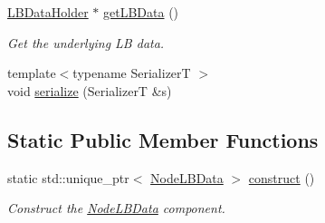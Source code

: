 \begin{DoxyCompactItemize}
\hyperlink{structvt_1_1vrt_1_1collection_1_1balance_1_1_l_b_data_holder}{L\+B\+Data\+Holder} $\ast$ \hyperlink{structvt_1_1vrt_1_1collection_1_1balance_1_1_node_l_b_data_aa67707482afa83dfa96910ac42337ef0}{get\+L\+B\+Data} ()
\begin{DoxyCompactList}\small\item\em Get the underlying LB data. \end{DoxyCompactList}\item 
{\footnotesize template$<$typename SerializerT $>$ }\\void \hyperlink{structvt_1_1vrt_1_1collection_1_1balance_1_1_node_l_b_data_aa6b20e4b1920e9294fb8b933dcd8a35b}{serialize} (SerializerT \&s)
\end{DoxyCompactItemize}
\subsection*{Static Public Member Functions}
\begin{DoxyCompactItemize}
\item 
static std\+::unique\+\_\+ptr$<$ \hyperlink{structvt_1_1vrt_1_1collection_1_1balance_1_1_node_l_b_data}{Node\+L\+B\+Data} $>$ \hyperlink{structvt_1_1vrt_1_1collection_1_1balance_1_1_node_l_b_data_a8c75ad477772cebf032e7c3664d2e62c}{construct} ()
\begin{DoxyCompactList}\small\item\em Construct the \hyperlink{structvt_1_1vrt_1_1collection_1_1balance_1_1_node_l_b_data}{Node\+L\+B\+Data} component. \end{DoxyCompactList}\end{DoxyCompactItemize}
